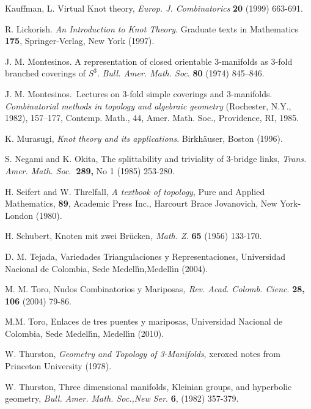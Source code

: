 \documentclass{amsproc}\usepackage{eurosym}
\theoremstyle{plain}
\numberwithin{equation}{section}
\begin{document}
\begin{thebibliography}{99}
Kauffman, L. Virtual Knot theory, \textit{Europ. J.
Combinatorics} \textbf{20} (1999) 663-691.

R. Lickorish. \textit{An Introduction to Knot Theory}. Graduate
texts in Mathematics \textbf{175}, Springer-Verlag, New York (1997).

J. M. Montesinos. A representation of closed orientable
3-manifolds as 3-fold branched coverings of $S^{3}$. \textit{Bull. Amer. Math.
Soc}. \textbf{80} (1974) 845--846.

J. M. Montesinos.\textit{\ }Lectures on 3-fold simple
coverings and 3-manifolds. \textit{Combinatorial methods in topology and
algebraic geometry} (Rochester, N.Y., 1982), 157--177, Contemp. Math., 44,
Amer. Math. Soc., Providence, RI, 1985.

K. Murasugi, \textit{Knot theory and its applications}.
Birkh\"{a}user, Boston (1996).

S. Negami and K. Okita, The splittability and triviality of
3-bridge links, \textit{Trans. Amer. Math. Soc}.\textbf{\ 289, }No 1 (1985) 253-280.

H. Seifert and W. Threlfall, \textit{A textbook of
topology}, Pure and Applied Mathematics, \textbf{89}, Academic Press Inc.,
Harcourt Brace Jovanovich, New York-London (1980).

H. Schubert, Knoten mit zwei Br\"{u}cken\textit{, Math. Z.
}\textbf{65 }(1956) 133-170.

D. M. Tejada, Variedades Triangulaciones y Representaciones,
Universidad Nacional de Colombia, Sede Medell\'{\i}n,Medell\'{\i}n (2004).

M. M. Toro, Nudos Combinatorios y Mariposas\textit{, Rev. Acad.
Colomb. Cienc}. \textbf{28, 106} (2004) 79-86.

M.M. Toro, Enlaces de tres puentes y mariposas, Universidad
Nacional de Colombia, Sede Medell\'{\i}n, Medell\'{\i}n (2010).

W. Thurston, \textit{Geometry and Topology of 3-Manifolds},
xeroxed notes from Princeton University (1978).

W. Thurston, Three dimensional manifolds, Kleinian groups, and
hyperbolic geometry, \textit{Bull. Amer. Math. Soc.,New Ser}. \textbf{6},
(1982) 357-379.
\end{thebibliography}
\end{document}
